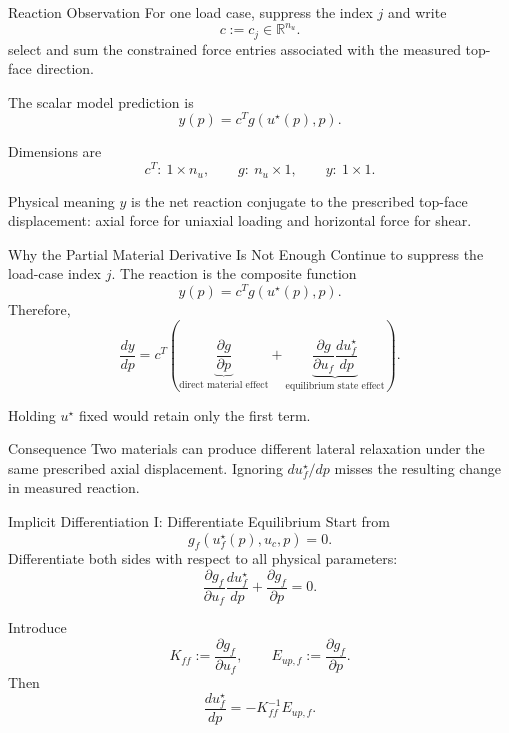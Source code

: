 \documentclass[aspectratio=169,10pt]{beamer}
\newcommand{\Kff}{K_{\!ff}}
\newcommand{\Eupf}{E_{up,f}}
\begin{document}
\begin{frame}{Reaction Observation}
  \small
  For one load case, suppress the index $j$ and write
  \[
    c:=c_j\in\mathbb R^{n_u}.
  \]
  select and sum the constrained force entries associated with the measured
  top-face direction.

  The scalar model prediction is
  \[
    \boxed{
      y(p)=c^T g(u^\star(p),p)
    }.
  \]

  Dimensions are
  \[
    c^T:\ 1\times n_u,\qquad
    g:\ n_u\times1,\qquad
    y:\ 1\times1.
  \]

  \begin{block}{Physical meaning}
    $y$ is the net reaction conjugate to the prescribed top-face
    displacement: axial force for uniaxial loading and horizontal force for
    shear.
  \end{block}
\end{frame}

\begin{frame}{Why the Partial Material Derivative Is Not Enough}
  \small
  Continue to suppress the load-case index $j$.
  The reaction is the composite function
  \[
    y(p)=c^Tg(u^\star(p),p).
  \]
  Therefore,
  \[
    \frac{dy}{dp}
    =
    c^T
    \left(
      \underbrace{\frac{\partial g}{\partial p}}_{\text{direct material effect}}
      +
      \underbrace{\frac{\partial g}{\partial u_f}
      \frac{du_f^\star}{dp}}_{\text{equilibrium state effect}}
    \right).
  \]

  Holding $u^\star$ fixed would retain only the first term.

  \begin{alertblock}{Consequence}
    Two materials can produce different lateral relaxation under the same
    prescribed axial displacement. Ignoring $du_f^\star/dp$ misses the
    resulting change in measured reaction.
  \end{alertblock}
\end{frame}

\begin{frame}{Implicit Differentiation I: Differentiate Equilibrium}
  \small
  Start from
  \[
    g_f(u_f^\star(p),u_c,p)=0.
  \]
  Differentiate both sides with respect to all physical parameters:
  \[
    \frac{\partial g_f}{\partial u_f}
    \frac{du_f^\star}{dp}
    +
    \frac{\partial g_f}{\partial p}
    =0.
  \]

  Introduce
  \[
    \Kff
    :=
    \frac{\partial g_f}{\partial u_f},
    \qquad
    \Eupf
    :=
    \frac{\partial g_f}{\partial p}.
  \]
  Then
  \[
    \boxed{
      \frac{du_f^\star}{dp}
      =
      -\Kff^{-1}\Eupf
    }.
  \]
\end{frame}
\end{document}

